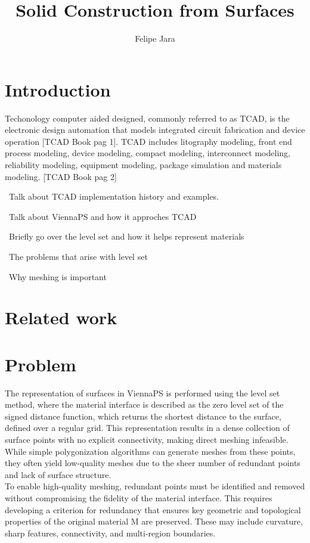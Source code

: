 \documentclass[submission]{eptcs}
\title{Solid Construction from Surfaces}
\author{ Felipe Jara
\institute{Department of Computer Science\\
University of Chile\\
Santiago, Chile}
\email{fjararibet@gmail.com}
}
\begin{document}
\maketitle

\section{Introduction}

Techonology computer aided designed, commonly referred to as TCAD, is the electronic design automation that models integrated circuit fabrication and device operation [TCAD Book pag 1]. TCAD includes litography modeling, front end process modeling, device modeling, compact modeling, interconnect modeling, reliability modeling, equipment modeling, package simulation and materials modeling. [TCAD Book pag 2]

~Talk about TCAD implementation history and examples.

~Talk about ViennaPS and how it approches TCAD

~Briefly go over the level set and how it helps represent materials

~The problems that arise with level set

~Why meshing is important


\section{Related work}


\section{Problem}

The representation of surfaces in ViennaPS is performed using the level set method, where the material interface is described as the zero level set of the signed distance function, which returns the shortest distance to the surface, defined over a regular grid. This representation results in a dense collection of surface points with no explicit connectivity, making direct meshing infeasible. While simple polygonization algorithms can generate meshes from these points, they often yield low-quality meshes due to the sheer number of redundant points and lack of surface structure. \\

To enable high-quality meshing, redundant points must be identified and removed without compromising the fidelity of the material interface. This requires developing a criterion for redundancy that ensures key geometric and topological properties of the original material M are preserved. These may include curvature, sharp features, connectivity, and multi-region boundaries. \\
\end{document}
